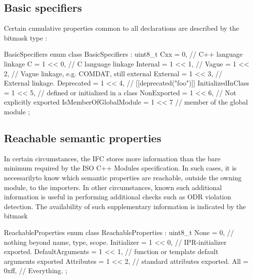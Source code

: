 \subsection{Basic specifiers}
\label{sec:ifc-basic-specifiers}

Certain cumulative properties common to all declarations are described by the bitmask type :
%
\begin{typedef}{BasicSpecifiers}{}
	enum class BasicSpecifiers : uint8_t {
		Cxx                     = 0,        // C++ language linkage
		C                       = 1 << 0,   // C language linkage
		Internal                = 1 << 1,   // 
		Vague                   = 1 << 2,   // Vague linkage, e.g. COMDAT, still external
		External                = 1 << 3,   // External linkage.
		Deprecated              = 1 << 4,   // [[deprecated("foo")]]
		InitializedInClass      = 1 << 5,   // defined or initialized in a class
		NonExported             = 1 << 6,   // Not explicitly exported
		IsMemberOfGlobalModule  = 1 << 7    // member of the global module
	};
\end{typedef}
%


\subsection{Reachable semantic properties}
\label{sec:ifc-reachable-properties}

In certain circumstances, the IFC stores more information than the bare minimum
required by the ISO C++ Modules specification.  In such cases, it is necessarilyto know 
which semantic properties are reachable, outside the owning module, to the importers.
In other circumstances, known such additional information is useful in performing
additional checks such as ODR violation detection.  The availability of such
supplementary information is indicated by the bitmask 
\begin{typedef}{ReachableProperties}{}
    enum class ReachableProperties : uint8_t {
        None                = 0,        // nothing beyond name, type, scope.
        Initializer         = 1 << 0,   // IPR-initializer exported.
        DefaultArguments    = 1 << 1,   // function or template default arguments exported
        Attributes          = 1 << 2,   // standard attributes exported.
        All                 = 0xff,     // Everything.
    };
\end{typedef}
%



